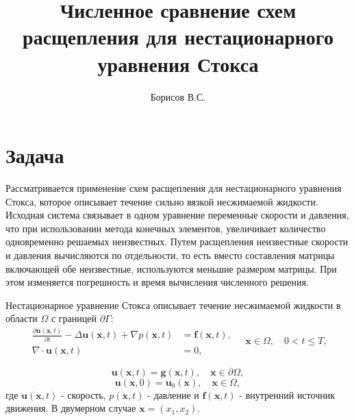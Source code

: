 \documentclass[12pt]{article}
\title{Численное сравнение схем расщепления для нестационарного уравнения Стокса}
\author{Борисов В.С.}
\begin{document}
\maketitle

\section{Задача}
Рассматривается применение схем расщепления для нестационарного уравнения Стокса, которое описывает течение сильно вязкой несжимаемой жидкости. Исходная система связывает в одном уравнение переменные скорости и давления, что при использовании метода конечных элементов, увеличивает количество одновременно решаемых неизвестных. Путем расщепления неизвестные скорости и давления вычисляются по отдельности, то есть вместо составления матрицы включающей обе неизвестные, используются меньшие размером матрицы. При этом изменяется погрешность и время вычисления численного решения.

Нестационарное уравнение Стокса описывает течение несжимаемой жидкости в области $\Omega$ с границей $\partial \Gamma$:
\begin{equation}
\begin{split}
\frac{\partial {\bm u}({\bm x}, t)}{\partial t} -\Delta {\bm u}({\bm x}, t) + \nabla p({\bm x}, t) &= {\bm f}({\bm x}, t), \\
\nabla\cdot{\bm u}({\bm x}, t) &= 0, 
\end{split}
\quad {\bm x} \in \Omega, \quad 0<t \leq T,
\end{equation} 

$$
{\bm u(\bm x, t)} = {\bm g}({\bm x}, t), \quad {\bm x} \in \partial \Omega,
$$
$$
{\bm u(\bm x, 0)} = {\bm u_0}({\bm x}), \quad {\bm x} \in \Omega,
$$
где ${\bm u}({\bm x}, t)$ - скорость, $p({\bm x}, t)$ - давление и ${\bm f}({\bm x}, t)$ - внутренний источник движения. В двумерном случае ${\bm x}=(x_1, x_2)$.
\end{document}

